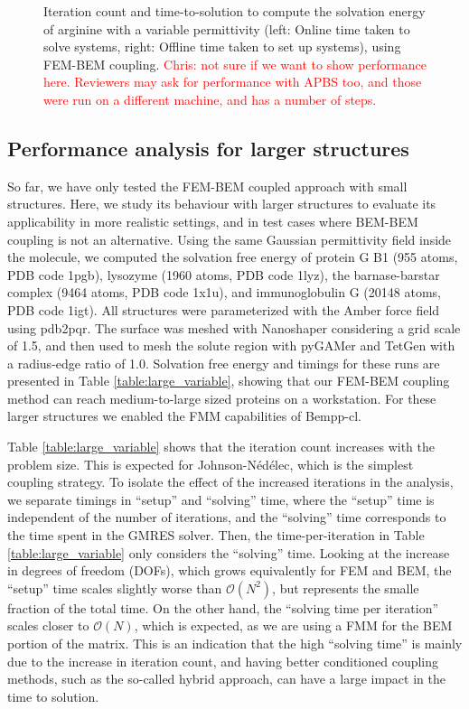 \begin{figure}
\caption{Iteration count and time-to-solution to compute the solvation energy of arginine with a variable permittivity (left: Online time taken to solve systems, right: Offline time taken to set up systems), using FEM-BEM coupling. %
\textcolor{red}{Chris: not sure if we want to show performance here. Reviewers may ask for performance with APBS too, and those were run on a different machine, and has a number of steps.}}
\label{fig:arg2_variable}
\end{figure}


\subsection*{\sffamily \large Performance analysis for larger structures}

So far, we have only tested the FEM-BEM coupled approach with small structures. Here, we study its behaviour with larger structures to evaluate its applicability in more realistic settings, and  in test cases where BEM-BEM coupling is not an alternative. Using the same Gaussian permittivity field inside the molecule, we computed the solvation free energy of protein G B1 (955 atoms, PDB code 1pgb), lysozyme (1960 atoms, PDB code 1lyz), the barnase-barstar complex (9464 atoms, PDB code 1x1u), and immunoglobulin G (20148 atoms, PDB code 1igt). All structures were parameterized with the Amber\cite{Swanson05} force field using pdb2pqr.\cite{Dolinsky04} The surface was meshed with Nanoshaper\cite{decherchi2013general} considering a grid scale of 1.5, and then used to mesh the solute region with pyGAMer\cite{lee2020open} and TetGen\cite{hang2015tetgen} with a radius-edge ratio of 1.0. Solvation free energy and timings for these runs are presented in Table \ref{table:large_variable}, showing that our FEM-BEM coupling method can reach medium-to-large sized proteins on a workstation. For these larger structures we enabled the FMM capabilities of Bempp-cl.

Table \ref{table:large_variable} shows that the iteration count increases with the problem size. This is expected for Johnson-N\'ed\'elec, which is the simplest coupling strategy. To isolate the effect of the increased iterations in the analysis, we separate timings in ``setup'' and ``solving'' time, where the ``setup'' time is independent of the number of iterations, and the ``solving'' time corresponds to the time spent in the GMRES solver. Then, the time-per-iteration in Table \ref{table:large_variable} only considers the ``solving'' time. Looking at the increase in degrees of freedom (DOFs), which grows equivalently for FEM and BEM, the ``setup'' time scales slightly worse than $\mathcal{O}(N^2)$, but represents the smalle fraction of the total time. On the other hand, the ``solving time per iteration'' scales closer to $\mathcal{O}(N)$, which is expected, as we are using a FMM for the BEM portion of the matrix. This is an indication that the high ``solving time'' is mainly due to the increase in iteration count, and having better conditioned coupling methods, such as the so-called hybrid approach,\cite{betcke2022hybrid} can have a large impact in the time to solution.

